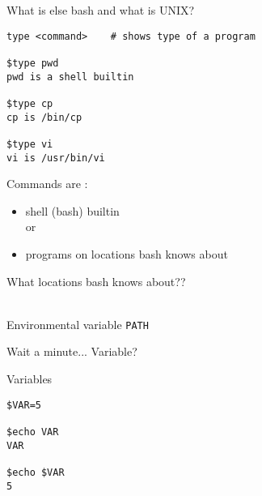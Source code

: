 \documentclass[xcolor=dvipsnames]{beamer}
\begin{document}
\begin{frame}
	\begin{center}
		\huge
		What is else bash and what is UNIX?\\
	\end{center}
\end{frame}

\begin{frame}[fragile]
\large
\begin{verbatim}
type <command>    # shows type of a program

$type pwd
pwd is a shell builtin

$type cp
cp is /bin/cp

$type vi
vi is /usr/bin/vi
\end{verbatim}
\end{frame}

\begin{frame}
	\LARGE
	Commands are :
	\begin{itemize}
		\item shell (bash) builtin \\ \large or
		\LARGE
		\item programs on locations bash knows about
	\end{itemize}
\end{frame}

\begin{frame}[fragile]
	\begin{center}
		\Huge
		What locations bash knows about?? \\
	\end{center}
	~\\
	\LARGE
	Environmental variable \verb!PATH!
\end{frame}

\begin{frame}[fragile]
	\begin{center}
		\Huge
		Wait a minute... Variable?
	\end{center}
\end{frame}

\begin{frame}[fragile]
	\begin{center}
		\Huge
		Variables
	\end{center}
\huge
\begin{verbatim}
$VAR=5

$echo VAR
VAR

$echo $VAR
5
\end{verbatim}
\end{frame}
\end{document}

